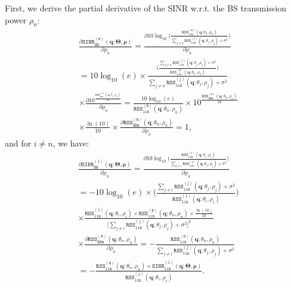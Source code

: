 First, we derive the partial derivative of the SINR w.r.t. the BS transmission power $\rho_n$:
\begin{align}
    &\frac{\partial \mathtt{SINR_{dB}^{(n)}}(\bm{q};\bm{\Theta},\bm{\rho})}{\partial \rho_n} = \frac{\partial 10 \log_{10}\bigg(\frac{\mathtt{RSS_{lin}^{(n)}}(\bm{q};\theta_n,\rho_n)}{\sum_{j\neq n}\mathtt{RSS_{lin}^{(j)}}(\bm{q};\theta_j,\rho_j) + \sigma^2 }\bigg) }{\partial \rho_n} \nonumber\\
    &= 10 \log_{10}(e)  
    \times \frac{\bigg(\frac{\sum_{j\neq n}\mathtt{RSS_{lin}^{(j)}}(\bm{q};\theta_j,\rho_j) + \sigma^2 }{\mathtt{RSS_{lin}^{(n)}}(\bm{q};\theta_n,\rho_n)}\bigg)}{\sum_{j\neq n}\mathtt{RSS_{lin}^{(j)}}(\bm{q};\theta_j,\rho_j) + \sigma^2} \nonumber \\ & \times \frac{\partial 10^{\frac{\mathtt{RSS_{dBm}^{(n)}}(\bm{q};\theta_n,\rho_n)}{10}} }{\partial \rho_n} 
    = \frac{10 \log_{10}(e)}{\mathtt{RSS_{lin}^{(n)}}(\bm{q};\theta_n,\rho_n)} \times 10^{\frac{\mathtt{RSS_{dBm}^{(n)}}(\bm{q};\theta_n,\rho_n)}{10}} \nonumber\\& \times \frac{\ln(10)}{10} \times \frac{\partial \mathtt{RSS_{dBm}^{(n)}}(\bm{q};\theta_n,\rho_n)}{\partial \rho_n} 
    = 1, \label{sinr-power-allocation-gradient-proof-eq1}
\end{align}
and for $i\neq n$, we have:
\begin{align}
    &\frac{\partial \mathtt{SINR_{dB}^{(i)}}(\bm{q};\bm{\Theta},\bm{\rho})}{\partial \rho_n} = \frac{\partial 10 \log_{10}\bigg(\frac{\mathtt{RSS_{lin}^{(i)}}(\bm{q};\theta_i,\rho_i)}{\sum_{j\neq i}\mathtt{RSS_{lin}^{(j)}}(\bm{q};\theta_j,\rho_j) + \sigma^2 }\bigg) }{\partial \rho_n} \nonumber\\&
    = -10 \log_{10}(e) \times \bigg(\frac{\sum_{j\neq i}\mathtt{RSS_{lin}^{(j)}}(\bm{q};\theta_j,\rho_j) + \sigma^2 }{\mathtt{RSS_{lin}^{(i)}}(\bm{q};\theta_i,\rho_i)}\bigg) \nonumber \\&
    \times \frac{\mathtt{RSS_{lin}^{(i)}}(\bm{q};\theta_i,\rho_i) \times \mathtt{RSS_{lin}^{(n)}}(\bm{q};\theta_n,\rho_n) \times \frac{\ln(10)}{10}  }{\Big[\sum_{j\neq i}\mathtt{RSS_{lin}^{(j)}}(\bm{q};\theta_j,\rho_j) + \sigma^2 \Big]^2} \nonumber\\& \times \frac{\partial \mathtt{RSS_{dBm}^{(n)}}(\bm{q};\theta_n,\rho_n)}{\partial \rho_n} 
    = - \frac{\mathtt{RSS_{lin}^{(n)}}(\bm{q};\theta_n,\rho_n)}{\sum_{j\neq i}\mathtt{RSS_{lin}^{(j)}}(\bm{q};\theta_j,\rho_j) + \sigma^{2} } \nonumber\\&
    = - \frac{\mathtt{RSS_{lin}^{(n)}}(\bm{q};\theta_n,\rho_n) \times \mathtt{SINR_{lin}^{(i)}}(\bm{q};\bm{\Theta},\bm{\rho})}{\mathtt{RSS_{lin}^{(i)}}(\bm{q};\theta_i,\rho_i)}. \label{sinr-power-allocation-gradient-proof-eq2}
\end{align}
